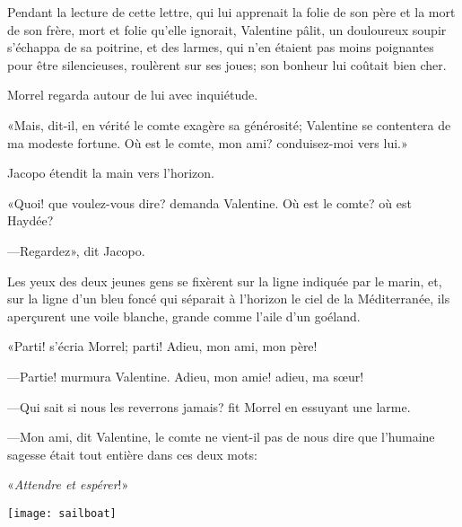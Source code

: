 Pendant la lecture de cette lettre, qui lui apprenait la folie de son père et la mort de son frère, mort et folie qu'elle ignorait, Valentine pâlit, un douloureux soupir s'échappa de sa poitrine, et des larmes, qui n'en étaient pas moins poignantes pour être silencieuses, roulèrent sur ses joues; son bonheur lui coûtait bien cher. 

Morrel regarda autour de lui avec inquiétude. 

«Mais, dit-il, en vérité le comte exagère sa générosité; Valentine se contentera de ma modeste fortune. Où est le comte, mon ami? conduisez-moi vers lui.» 

Jacopo étendit la main vers l'horizon. 

«Quoi! que voulez-vous dire? demanda Valentine. Où est le comte? où est Haydée? 

—Regardez», dit Jacopo. 

Les yeux des deux jeunes gens se fixèrent sur la ligne indiquée par le marin, et, sur la ligne d'un bleu foncé qui séparait à l'horizon le ciel de la Méditerranée, ils aperçurent une voile blanche, grande comme l'aile d'un goéland. 

«Parti! s'écria Morrel; parti! Adieu, mon ami, mon père! 

—Partie! murmura Valentine. Adieu, mon amie! adieu, ma sœur! 

—Qui sait si nous les reverrons jamais? fit Morrel en essuyant une larme. 

—Mon ami, dit Valentine, le comte ne vient-il pas de nous dire que l'humaine sagesse était tout entière dans ces deux mots: 

«\textit{Attendre et espérer}!» 

\vfill
\centerline{\texttt{[image: sailboat]}}
\vfill